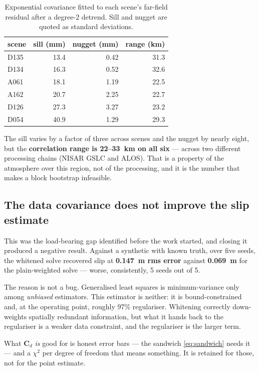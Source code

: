 \documentclass[11pt,a4paper]{article}
\newcommand{\Cd}{\mathbf{C}_d}
\begin{document}
\begin{table}[htbp]
\centering
\small
\begin{tabular}{lrrr}
\toprule
scene & sill (mm) & nugget (mm) & range (km) \\
\midrule
D135 & 13.4 & 0.42 & 31.3 \\
D134 & 16.3 & 0.52 & 32.6 \\
A061 & 18.1 & 1.19 & 22.5 \\
A162 & 20.7 & 2.25 & 22.7 \\
D126 & 27.3 & 3.27 & 23.2 \\
D054 & 40.9 & 1.29 & 29.3 \\
\bottomrule
\end{tabular}
\caption{Exponential covariance fitted to each scene's far-field residual after
a degree-2 detrend. Sill and nugget are quoted as standard deviations.}
\label{tab:cov}
\end{table}

The sill varies by a factor of three across scenes and the nugget by nearly
eight, but the \textbf{correlation range is 22--33~km on all six} --- across two
different processing chains (NISAR GSLC and ALOS). That is a property of the
atmosphere over this region, not of the processing, and it is the number that
makes a block bootstrap infeasible.

\subsection{The data covariance does not improve the slip estimate}

This was the load-bearing gap identified before the work started, and closing it
produced a negative result. Against a synthetic with known truth, over five
seeds, the whitened solve recovered slip at \textbf{0.147~m rms error} against
\textbf{0.069~m} for the plain-weighted solve --- worse, consistently, 5 seeds
out of 5.

The reason is not a bug. Generalised least squares is minimum-variance only among
\emph{unbiased} estimators. This estimator is neither: it is bound-constrained
and, at the operating point, roughly 97\% regulariser. Whitening correctly
down-weights spatially redundant information, but what it hands back to the
regulariser is a weaker data constraint, and the regulariser is the larger term.

What $\Cd$ \emph{is} good for is honest error bars --- the sandwich
\eqref{eq:sandwich} needs it --- and a $\chi^2$ per degree of freedom that means
something. It is retained for those, not for the point estimate.
\end{document}
